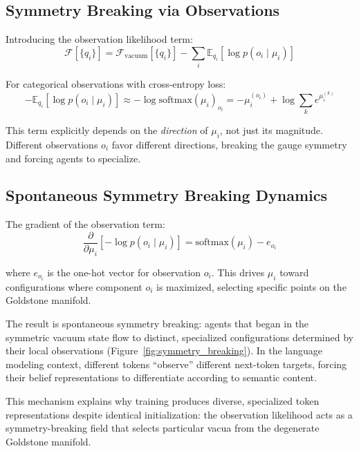 \documentclass[twoside,11pt]{article}
\begin{document}
\subsection{Symmetry Breaking via Observations}

Introducing the observation likelihood term:
\begin{equation}
\mathcal{F}[\{q_i\}] = \mathcal{F}_{\text{vacuum}}[\{q_i\}] - \sum_i \mathbb{E}_{q_i}[\log p(o_i \mid \mu_i)]
\end{equation}

For categorical observations with cross-entropy loss:
\begin{equation}
-\mathbb{E}_{q_i}[\log p(o_i \mid \mu_i)] \approx -\log \mathrm{softmax}(\mu_i)_{o_i} = -\mu_i^{(o_i)} + \log \sum_k e^{\mu_i^{(k)}}
\end{equation}

This term explicitly depends on the \emph{direction} of $\mu_i$, not just its magnitude. Different observations $o_i$ favor different directions, breaking the gauge symmetry and forcing agents to specialize.

\subsection{Spontaneous Symmetry Breaking Dynamics}

The gradient of the observation term:
\begin{equation}
\frac{\partial}{\partial \mu_i}\left[-\log p(o_i \mid \mu_i)\right] = \mathrm{softmax}(\mu_i) - e_{o_i}
\end{equation}

where $e_{o_i}$ is the one-hot vector for observation $o_i$. This drives $\mu_i$ toward configurations where component $o_i$ is maximized, selecting specific points on the Goldstone manifold.

The result is spontaneous symmetry breaking: agents that began in the symmetric vacuum state flow to distinct, specialized configurations determined by their local observations (Figure~\ref{fig:symmetry_breaking}). In the language modeling context, different tokens ``observe'' different next-token targets, forcing their belief representations to differentiate according to semantic content.

This mechanism explains why training produces diverse, specialized token representations despite identical initialization: the observation likelihood acts as a symmetry-breaking field that selects particular vacua from the degenerate Goldstone manifold.
\end{document}
